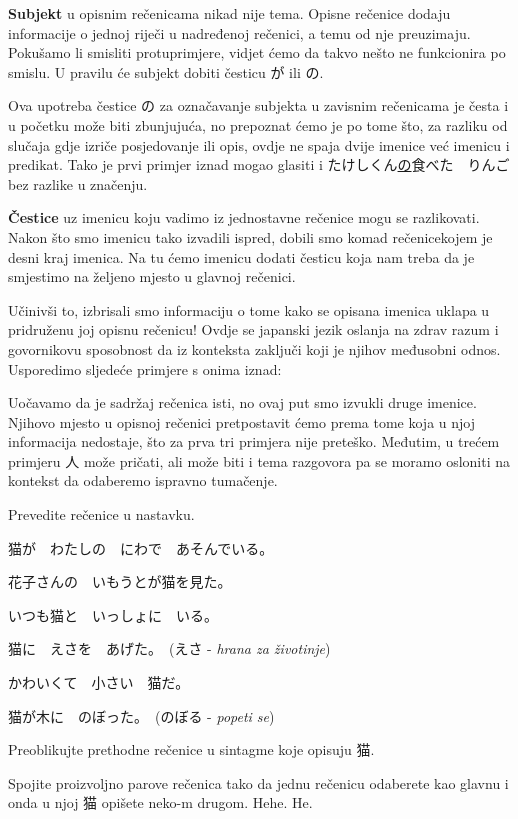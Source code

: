 	\vspace{5pt}
	\textbf{Subjekt} u opisnim rečenicama nikad nije tema. Opisne rečenice dodaju informacije o jednoj riječi u nadređenoj rečenici, a temu od nje preuzimaju. Pokušamo li smisliti protuprimjere, vidjet ćemo da takvo nešto ne funkcionira po smislu. U pravilu će subjekt dobiti česticu が ili の.
	
	Ova upotreba čestice の za označavanje subjekta u zavisnim rečenicama je česta i u početku može biti zbunjujuća, no prepoznat ćemo je po tome što, za razliku od slučaja gdje izriče posjedovanje ili opis, ovdje ne spaja dvije imenice već imenicu i predikat. Tako je prvi primjer iznad mogao glasiti i たけしくん\underline{の}食べた　りんご bez razlike u značenju.
	
	\vspace{5pt}
	\textbf{Čestice} uz imenicu koju vadimo iz jednostavne rečenice mogu se razlikovati. Nakon što smo imenicu tako izvadili ispred, dobili smo komad rečenice\footnotemark[5] kojem je desni kraj imenica. Na tu ćemo imenicu dodati česticu koja nam treba da je smjestimo na željeno mjesto u glavnoj rečenici.
	
	
	Učinivši to, izbrisali smo informaciju o tome kako se opisana imenica uklapa u pridruženu joj opisnu rečenicu! Ovdje se japanski jezik oslanja na zdrav razum i govornikovu sposobnost da iz konteksta zaključi koji je njihov međusobni odnos. Usporedimo sljedeće primjere s onima iznad:
	
	\begin{reibun}
	\end{reibun}

	Uočavamo da je sadržaj rečenica isti, no ovaj put smo izvukli druge imenice. Njihovo mjesto u opisnoj rečenici pretpostavit ćemo prema tome koja u njoj informacija nedostaje, što za prva tri primjera nije preteško. Međutim, u trećem primjeru 人 može pričati, ali može biti i tema razgovora pa se moramo osloniti na kontekst da odaberemo ispravno tumačenje.
	
	
	\begin{mondai}{Prevedite rečenice u nastavku.}
		\item 猫が　わたしの　にわで　あそんでいる。
		\item 花子さんの　いもうとが猫を見た。
		\item いつも猫と　いっしょに　いる。
		\item 猫に　えさを　あげた。　(えさ - \textit{hrana za životinje})
		\item かわいくて　小さい　猫だ。
		\item 猫が木に　のぼった。　(のぼる - \textit{popeti se})
	\end{mondai}

	\noindent
	Preoblikujte prethodne rečenice u sintagme koje opisuju 猫.
	
	\vspace{5pt}\noindent
	Spojite proizvoljno parove rečenica tako da jednu rečenicu odaberete kao glavnu i onda u njoj 猫 opišete neko-m drugom. Hehe. He.

